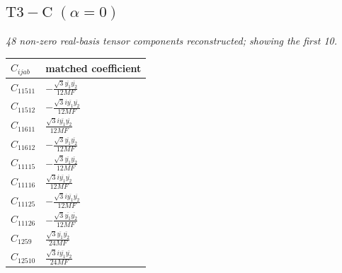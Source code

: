 \documentclass[9pt]{article}
\begin{document}
\subsection*{$ \mathrm{T3-C}\;(\alpha=0) $}
\textit{48 non-zero real-basis tensor components reconstructed; showing the first 10.}
\begin{longtable}{@{}ll@{}}
\toprule
$C_{ijab}$ & matched coefficient \\
\midrule
$C_{11511}$ & $ - \frac{\sqrt{3} \overline{y_{1}} \overline{y_{2}}}{12 MF} $ \\
$C_{11512}$ & $ - \frac{\sqrt{3} i \overline{y_{1}} \overline{y_{2}}}{12 MF} $ \\
$C_{11611}$ & $ \frac{\sqrt{3} i \overline{y_{1}} \overline{y_{2}}}{12 MF} $ \\
$C_{11612}$ & $ - \frac{\sqrt{3} \overline{y_{1}} \overline{y_{2}}}{12 MF} $ \\
$C_{11115}$ & $ - \frac{\sqrt{3} \overline{y_{1}} \overline{y_{2}}}{12 MF} $ \\
$C_{11116}$ & $ \frac{\sqrt{3} i \overline{y_{1}} \overline{y_{2}}}{12 MF} $ \\
$C_{11125}$ & $ - \frac{\sqrt{3} i \overline{y_{1}} \overline{y_{2}}}{12 MF} $ \\
$C_{11126}$ & $ - \frac{\sqrt{3} \overline{y_{1}} \overline{y_{2}}}{12 MF} $ \\
$C_{1259}$ & $ \frac{\sqrt{3} \overline{y_{1}} \overline{y_{2}}}{24 MF} $ \\
$C_{12510}$ & $ \frac{\sqrt{3} i \overline{y_{1}} \overline{y_{2}}}{24 MF} $ \\
\bottomrule
\end{longtable}
\end{document}

